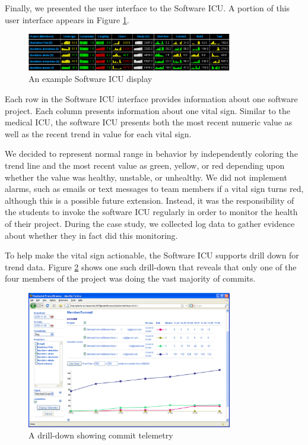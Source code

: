 \documentclass[10pt,twocolumn]{article}
\begin{document}
Finally, we presented the user interface to the Software ICU. A portion of
this user interface appears in Figure \ref{fig:sicu}.

\begin{figure}[ht]
  \center
  \includegraphics[width=0.8\textwidth]{portfolio-2008.eps}
  \caption{An example Software ICU display}
  \label{fig:sicu}
\end{figure} 

Each row in the Software ICU interface provides information about one
software project.  Each column presents information about
one vital sign. Similar to the medical ICU, the software ICU presents both
the most recent numeric value as well as the recent trend in value for each
vital sign.

We decided to represent normal range in behavior by independently
coloring the trend line and the most recent value as green, yellow, or red
depending upon whether the value was healthy, unstable, or
unhealthy.  We did not implement alarms, such as emails or text
messages to team members if a vital sign turns red, although this is a
possible future extension.  Instead, it was the responsibility of the
students to invoke the software ICU regularly in order to monitor the
health of their project.  During the case study, we collected log data to
gather evidence about whether they in fact did this monitoring.

To help make the vital sign actionable, the Software ICU supports drill
down for trend data.  Figure \ref{fig:telemetry} shows one such drill-down
that reveals that only one of the four members of the project was doing the
vast majority of commits.

\begin{figure}[ht]
  \center
  \includegraphics[width=0.8\textwidth]{telemetry-screen.eps}
  \caption{A drill-down showing commit telemetry}
  \label{fig:telemetry}
\end{figure} 
\end{document}
